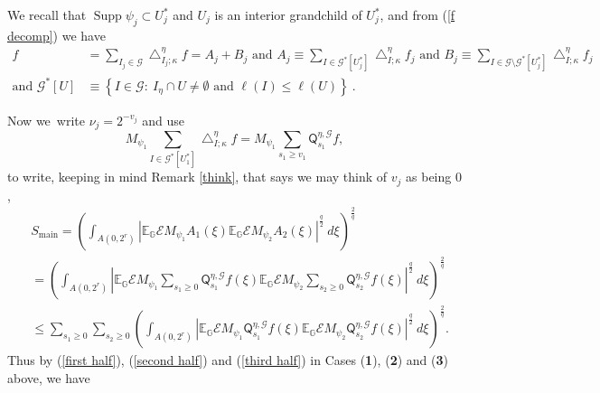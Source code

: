 \documentclass{amsart}%
\theoremstyle{plain}
\numberwithin{equation}{section}
\begin{document}
We recall that $\operatorname*{Supp}\psi_{j}\subset U_{j}^{\ast}$ and $U_{j}$
is an interior grandchild of $U_{j}^{\ast}$, and from (\ref{f decomp}) we
have
\begin{align*}
f  & =\sum_{I_{j}\in\mathcal{G}}\bigtriangleup_{I_{j};\kappa}^{\eta}%
f=A_{j}+B_{j}\text{ and }A_{j}\equiv\sum_{I\in\mathcal{G}^{\ast}\left[
U_{j}^{\ast}\right]  }\bigtriangleup_{I;\kappa}^{\eta}f_{j}\text{ and }%
B_{j}\equiv\sum_{I\in\mathcal{G\setminus G}^{\ast}\left[  U_{j}^{\ast}\right]
}\bigtriangleup_{I;\kappa}^{\eta}f_{j}\\
\text{and }\mathcal{G}^{\ast}\left[  U\right]   & \equiv\left\{
I\in\mathcal{G}:\ I_{\eta}\cap U\neq\emptyset\text{ and }\ell\left(  I\right)
\leq\ell\left(  U\right)  \right\}  \ .
\end{align*}


Now we\ write $\nu_{j}=2^{-v_{j}}$ and use%
\[
M_{\psi_{1}}\sum_{I\in\mathcal{G}^{\ast}\left[  U_{1}^{\ast}\right]
}\bigtriangleup_{I;\kappa}^{\eta}f=M_{\psi_{1}}\sum_{s_{1}\geq v_{1}%
}\mathsf{Q}_{s_{1}}^{\eta,\mathcal{G}}f,
\]
to write, keeping in mind Remark \ref{think}, that says we may think of
$v_{j}$ as being $0$,%
\begin{align*}
& S_{\operatorname*{main}}=\left(  \int_{A\left(  0,2^{r}\right)  }\left\vert
\mathbb{E}_{\mathbb{G}}\mathcal{E}M_{\psi_{1}}A_{1}\left(  \xi\right)
\mathbb{E}_{\mathbb{G}}\mathcal{E}M_{\psi_{2}}A_{2}\left(  \xi\right)
\right\vert ^{\frac{q}{2}}\ d\xi\right)  ^{\frac{2}{q}}\\
& =\left(  \int_{A\left(  0,2^{r}\right)  }\left\vert \mathbb{E}_{\mathbb{G}%
}\mathcal{E}M_{\psi_{1}}\sum_{s_{1}\geq0}\mathsf{Q}_{s_{1}}^{\eta,\mathcal{G}%
}f\left(  \xi\right)  \mathbb{E}_{\mathbb{G}}\mathcal{E}M_{\psi_{2}}%
\sum_{s_{2}\geq0}\mathsf{Q}_{s_{2}}^{\eta,\mathcal{G}}f\left(  \xi\right)
\right\vert ^{\frac{q}{2}}\ d\xi\right)  ^{\frac{2}{q}}\\
& \leq\sum_{s_{1}\geq0}\sum_{s_{2}\geq0}\left(  \int_{A\left(  0,2^{r}\right)
}\left\vert \mathbb{E}_{\mathbb{G}}\mathcal{E}M_{\psi_{1}}\mathsf{Q}_{s_{1}%
}^{\eta,\mathcal{G}}f\left(  \xi\right)  \mathbb{E}_{\mathbb{G}}%
\mathcal{E}M_{\psi_{2}}\mathsf{Q}_{s_{2}}^{\eta,\mathcal{G}}f\left(
\xi\right)  \right\vert ^{\frac{q}{2}}\ d\xi\right)  ^{\frac{2}{q}}.
\end{align*}
Thus by (\ref{first half}), (\ref{second half}) and (\ref{third half}) in
Cases (\textbf{1}), (\textbf{2}) and (\textbf{3}) above, we have
\end{document}
